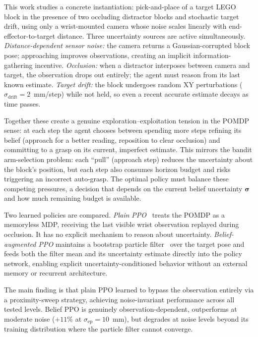 \documentclass[conference]{IEEEtran}
\newcommand{\sigmaep}{\sigma_{\text{ep}}}
\newcommand{\sdrift}{\sigma_{\text{drift}}}
\begin{document}
This work studies a concrete instantiation: pick-and-place of a target LEGO
block in the presence of two occluding distractor blocks and stochastic
target drift, using only a wrist-mounted camera whose noise scales linearly
with end-effector-to-target distance.
Three uncertainty sources are active simultaneously.
\emph{Distance-dependent sensor noise:} the camera returns a
Gaussian-corrupted block pose; approaching improves observations, creating
an implicit information-gathering incentive.
\emph{Occlusion:} when a distractor interposes between camera and target,
the observation drops out entirely; the agent must reason from its last
known estimate.
\emph{Target drift:} the block undergoes random XY perturbations
($\sdrift = 2$~mm/step) while not held, so even a recent accurate estimate
decays as time passes.

Together these create a genuine exploration--exploitation tension in the
POMDP sense: at each step the agent chooses between spending more steps
refining its belief (approach for a better reading, reposition to clear
occlusion) and committing to a grasp on its current, imperfect estimate.
This mirrors the bandit arm-selection problem: each ``pull'' (approach
step) reduces the uncertainty about the block's position, but each step
also consumes horizon budget and risks triggering an incorrect auto-grasp.
The optimal policy must balance these competing pressures, a decision that
depends on the current belief uncertainty $\bm{\sigma}$ and how much
remaining budget is available.

Two learned policies are compared.
\emph{Plain PPO}~\cite{schulman2017ppo} treats the POMDP as a memoryless
MDP, receiving the last visible wrist observation replayed during occlusion.
It has no explicit mechanism to reason about uncertainty.
\emph{Belief-augmented PPO} maintains a bootstrap particle
filter~\cite{gordon1993novel} over the target pose and feeds both the
filter mean and its uncertainty estimate directly into the policy network,
enabling explicit uncertainty-conditioned behavior without an external
memory or recurrent architecture.

The main finding is that plain PPO learned to bypass the observation
entirely via a proximity-sweep strategy, achieving noise-invariant
performance across all tested levels.
Belief PPO is genuinely observation-dependent, outperforms at moderate
noise ($+11\%$ at $\sigmaep = 10$~mm), but degrades at noise levels beyond
its training distribution where the particle filter cannot converge.
\end{document}
